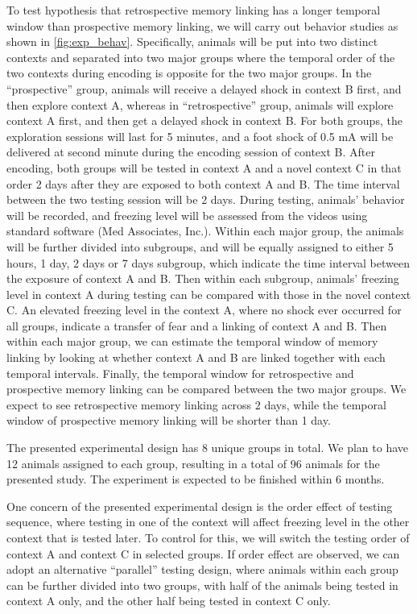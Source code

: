 \documentclass[master.tex]{subfiles}
\begin{document}
To test hypothesis that retrospective memory linking has a longer temporal
window than prospective memory linking, we will carry out behavior studies as
shown in \autoref{fig:exp_behav}. Specifically, animals will be put into two
distinct contexts and separated into two major groups where the temporal order
of the two contexts during encoding is opposite for the two major groups. In the
``prospective'' group, animals will receive a delayed shock in context B first,
and then explore context A, whereas in ``retrospective'' group, animals will
explore context A first, and then get a delayed shock in context B. For both
groups, the exploration sessions will last for 5 minutes, and a foot shock of
0.5 mA will be delivered at second minute during the encoding session of context
B. After encoding, both groups will be tested in context A and a novel context C
in that order 2 days after they are exposed to both context A and B. The time
interval between the two testing session will be 2 days. During testing,
animals' behavior will be recorded, and freezing level will be assessed from the
videos using standard software (Med Associates, Inc.). Within each major group,
the animals will be further divided into subgroups, and will be equally assigned
to either 5 hours, 1 day, 2 days or 7 days subgroup, which indicate the time
interval between the exposure of context A and B. Then within each subgroup,
animals' freezing level in context A during testing can be compared with those
in the novel context C. An elevated freezing level in the context A, where no
shock ever occurred for all groups, indicate a transfer of fear and a linking of
context A and B. Then within each major group, we can estimate the temporal
window of memory linking by looking at whether context A and B are linked
together with each temporal intervals. Finally, the temporal window for
retrospective and prospective memory linking can be compared between the two
major groups. We expect to see retrospective memory linking across 2 days, while
the temporal window of prospective memory linking will be shorter than 1 day.

The presented experimental design has 8 unique groups in total. We plan to have
12 animals assigned to each group, resulting in a total of 96 animals for the
presented study. The experiment is expected to be finished within 6 months.

One concern of the presented experimental design is the order effect of testing
sequence, where testing in one of the context will affect freezing level in the
other context that is tested later. To control for this, we will switch the
testing order of context A and context C in selected groups. If order effect are
observed, we can adopt an alternative ``parallel'' testing design, where animals
within each group can be further divided into two groups, with half of the
animals being tested in context A only, and the other half being tested in
context C only.
\end{document}
